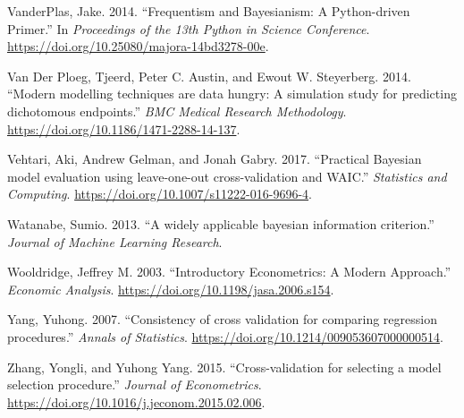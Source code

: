 \documentclass[]{article}
\begin{document}
\leavevmode\hypertarget{ref-VanderPlas2014}{}%
VanderPlas, Jake. 2014. ``Frequentism and Bayesianism: A Python-driven
Primer.'' In \emph{Proceedings of the 13th Python in Science
Conference}. \url{https://doi.org/10.25080/majora-14bd3278-00e}.

\leavevmode\hypertarget{ref-VanDerPloeg2014}{}%
Van Der Ploeg, Tjeerd, Peter C. Austin, and Ewout W. Steyerberg. 2014.
``Modern modelling techniques are data hungry: A simulation study for
predicting dichotomous endpoints.'' \emph{BMC Medical Research
Methodology}. \url{https://doi.org/10.1186/1471-2288-14-137}.

\leavevmode\hypertarget{ref-Vehtari2017}{}%
Vehtari, Aki, Andrew Gelman, and Jonah Gabry. 2017. ``Practical Bayesian
model evaluation using leave-one-out cross-validation and WAIC.''
\emph{Statistics and Computing}.
\url{https://doi.org/10.1007/s11222-016-9696-4}.

\leavevmode\hypertarget{ref-Watanabe2013}{}%
Watanabe, Sumio. 2013. ``A widely applicable bayesian information
criterion.'' \emph{Journal of Machine Learning Research}.

\leavevmode\hypertarget{ref-Wooldridge2003}{}%
Wooldridge, Jeffrey M. 2003. ``Introductory Econometrics: A Modern
Approach.'' \emph{Economic Analysis}.
\url{https://doi.org/10.1198/jasa.2006.s154}.

\leavevmode\hypertarget{ref-Yang2007}{}%
Yang, Yuhong. 2007. ``Consistency of cross validation for comparing
regression procedures.'' \emph{Annals of Statistics}.
\url{https://doi.org/10.1214/009053607000000514}.

\leavevmode\hypertarget{ref-Zhang2015}{}%
Zhang, Yongli, and Yuhong Yang. 2015. ``Cross-validation for selecting a
model selection procedure.'' \emph{Journal of Econometrics}.
\url{https://doi.org/10.1016/j.jeconom.2015.02.006}.
\end{document}
